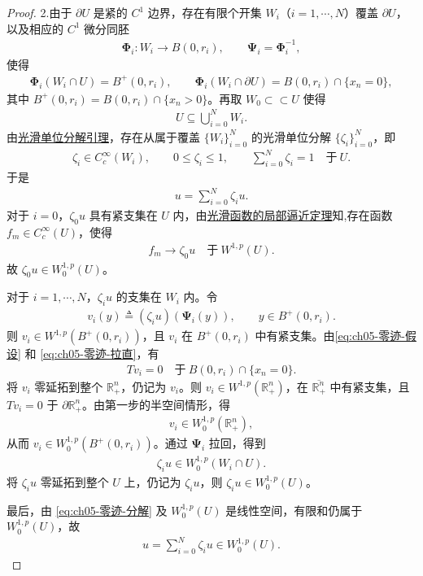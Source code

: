 \documentclass[../../main.tex]{subfiles}%
\begin{document}
\begin{proof}
2.由于 $\partial U$ 是紧的 $C^{1}$ 边界，存在有限个开集 $W_{i}$（$i=1,\cdots,N$）覆盖 $\partial U$，以及相应的 $C^{1}$ 微分同胚
\begin{align*}
\boldsymbol{\Phi}_{i}:W_{i}\to B(0,r_{i}),\qquad \boldsymbol{\Psi}_{i}=\boldsymbol{\Phi}_{i}^{-1},
\end{align*}
使得
\begin{align}\label{eq:ch05-零迹-拉直}
\boldsymbol{\Phi}_{i}(W_{i}\cap U)=B^{+}(0,r_{i}),\qquad
\boldsymbol{\Phi}_{i}(W_{i}\cap\partial U)=B(0,r_{i})\cap\{x_{n}=0\},
\end{align}
其中 $B^{+}(0,r_{i})=B(0,r_{i})\cap\{x_{n}>0\}$。再取 $W_{0}\subset\subset U$ 使得
\begin{align*}
U\subseteq \bigcup_{i=0}^{N}W_{i}.
\end{align*}
由\hyperref[lemma:ch05-光滑单位分解-p7R3]{光滑单位分解引理}，存在从属于覆盖 $\{W_{i}\}_{i=0}^{N}$ 的光滑单位分解 $\{\zeta_{i}\}_{i=0}^{N}$，即
\begin{align*}
\zeta_{i}\in C_{c}^{\infty}(W_{i}),\qquad 0\leqslant \zeta_{i}\leqslant 1,\qquad
\sum_{i=0}^{N}\zeta_{i}=1\quad\text{于}\ U.
\end{align*}
于是
\begin{align}\label{eq:ch05-零迹-分解}
u=\sum_{i=0}^{N}\zeta_{i}u.
\end{align}
对于 $i=0$，$\zeta_{0}u$ 具有紧支集在 $U$ 内，由\hyperref[theorem:ch05-光滑函数的局部逼近定理]{光滑函数的局部逼近定理}知,存在函数 $f_{m}\in C^{\infty}_{c}(U)$，使得
\begin{align*}
f_{m}\to \zeta_{0}u\quad\text{于}\ W^{1,p}(U).
\end{align*}
故 $\zeta_{0}u\in W^{1,p}_{0}(U)$。

对于 $i=1,\cdots,N$，$\zeta_{i}u$ 的支集在 $W_{i}$ 内。令
\begin{align*}
v_{i}(y)\triangleq (\zeta_{i}u)(\boldsymbol{\Psi}_{i}(y)),\qquad y\in B^{+}(0,r_{i}).
\end{align*}
则 $v_{i}\in W^{1,p}(B^{+}(0,r_{i}))$，且 $v_{i}$ 在 $B^{+}(0,r_{i})$ 中有紧支集。由\eqref{eq:ch05-零迹-假设} 和 \eqref{eq:ch05-零迹-拉直}，有
\begin{align*}
Tv_{i}=0\quad\text{于}\ B(0,r_{i})\cap\{x_{n}=0\}.
\end{align*}
将 $v_{i}$ 零延拓到整个 $\mathbb{R}^{n}_{+}$，仍记为 $v_{i}$。则 $v_{i}\in W^{1,p}(\mathbb{R}^{n}_{+})$，在 $\overline{\mathbb{R}^{n}_{+}}$ 中有紧支集，且 $Tv_{i}=0$ 于 $\partial\mathbb{R}^{n}_{+}$。由第一步的半空间情形，得
\begin{align*}
v_{i}\in W^{1,p}_{0}(\mathbb{R}^{n}_{+}),
\end{align*}
从而 $v_{i}\in W^{1,p}_{0}(B^{+}(0,r_{i}))$。通过 $\boldsymbol{\Psi}_{i}$ 拉回，得到
\begin{align*}
\zeta_{i}u\in W^{1,p}_{0}(W_{i}\cap U).
\end{align*}
将 $\zeta_{i}u$ 零延拓到整个 $U$ 上，仍记为 $\zeta_{i}u$，则 $\zeta_{i}u\in W^{1,p}_{0}(U)$。

最后，由 \eqref{eq:ch05-零迹-分解} 及 $W^{1,p}_{0}(U)$ 是线性空间，有限和仍属于 $W^{1,p}_{0}(U)$，故
\begin{align*}
u=\sum_{i=0}^{N}\zeta_{i}u\in W^{1,p}_{0}(U).
\end{align*}
\end{proof}
\end{document}
